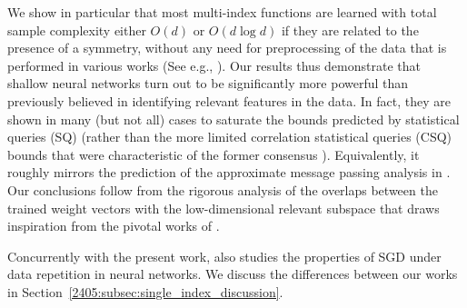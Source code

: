 We show in particular that most multi-index functions are learned with total sample complexity either $O(d)$ or $O(d \log d)$ if they are related to the presence of a symmetry, without any need for preprocessing of the data that is performed in various works (See e.g., \cite{mondelli2018fundamental,luo2019optimal,maillard2020phase,chen2020learning}).  Our results thus demonstrate that shallow neural networks turn out to be significantly more powerful than previously believed \citep{arous2021online,abbe2022merged,abbe2023sgd,arnaboldi2023high} in identifying relevant features in the data. In fact, they are shown in many (but not all) cases to saturate the bounds predicted by statistical queries (SQ)  \citep{damian2024computational} (rather than the more limited correlation statistical queries (CSQ) bounds that were characteristic of the former consensus \citep{arous2021online,abbe2023sgd}). Equivalently, it roughly  mirrors the prediction of the approximate message passing analysis in \citep{troiani2024fundamental}. Our conclusions follow from the rigorous analysis of the overlaps between the trained weight vectors with the low-dimensional relevant subspace that draws inspiration from the pivotal works of \cite{saad1995line,coolen2000dynamics,coolen2000line,arous2021online}.

Concurrently with the present work, \citep{lee2024neural} also studies the properties of SGD under data repetition in neural networks. We discuss the differences between our works in Section~\ref{2405:subsec:single_index_discussion}.
